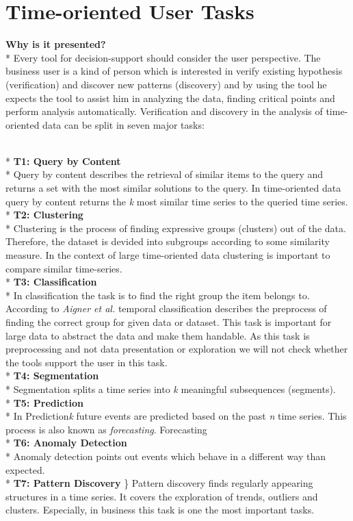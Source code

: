 \section{Time-oriented User Tasks} \label{tasks}
\textbf{Why is it presented?}\\*
Every tool for decision-support should consider the user perspective. The business user is a kind of person which is interested in verify existing hypothesis (verification) and discover new patterns (discovery) and by using the tool he expects the tool to assist him in analyzing the data, finding critical points and perform analysis automatically\cite{Brachman1996}. Verification and discovery in the analysis of time-oriented data can be split in seven major tasks\cite{Esling2012}:

\\*
\textbf{T1: Query by Content}\\*
Query by content describes the retrieval of similar items to the query and returns a set with the most similar solutions to the query. In time-oriented data query by content returns the \textit{k} most similar time series to the queried time series.
\\*
\textbf{T2: Clustering}\\*
Clustering is the process of finding expressive groups (clusters) out of the data. Therefore, the dataset is devided into subgroups according to some similarity measure. In the context of large time-oriented data clustering is important to compare similar time-series.
\\*
\textbf{T3: Classification}\\*
In classification the task is to find the right group the item belongs to. According to \textit{Aigner et al.} temporal classification describes the preprocess of finding the correct group for given data or dataset. This task is important for large data to abstract the data and make them handable. As this task is preprocessing and not data presentation or exploration we will not check whether the tools support the user in this task. 
\\*
\textbf{T4: Segmentation}\\*
Segmentation splits a time series into \textit{k} meaningful subsequences (segments)\cite{batyrshin2007perception}. 
\\*
\textbf{T5: Prediction}\\*
In Prediction\textit{k} future events are predicted based on the past \textit{n} time series. This process is also known as \textit{forecasting}. Forecasting 
\\*
\textbf{T6: Anomaly Detection} \\*
Anomaly detection points out events which behave in a different way than expected.
\\*
\textbf{T7: Pattern Discovery} \}\*
Pattern discovery finds regularly appearing structures in a time series.  It covers the exploration of trends, outliers and clusters. Especially, in business this task is one the most important tasks.


